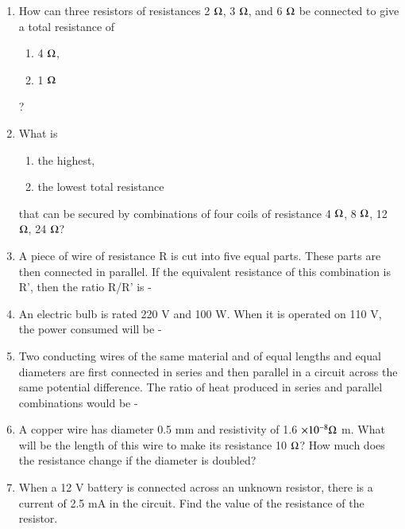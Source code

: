 \begin{enumerate}[label=\arabic*.,ref=\thesubsection.\theenumi]
\item  How can three resistors of resistances 2 $\ohm$, 3 $\ohm$, and 6 $\ohm$ be connected to give a total resistance of
 \begin{enumerate} \item 4 $\ohm$, \item 1 $\ohm$ \end{enumerate}?
\item What is 
\begin{enumerate} \item the highest, \item the lowest total resistance 
\end{enumerate}
that can be secured by combinations of four coils of resistance 4 $\ohm$, 8 $\ohm$, 12 $\ohm$, 24 $\ohm$?
\item  A piece of wire of resistance R is cut into five equal parts. These parts are then connected in parallel. If the equivalent resistance of this combination is R', then the ratio R/R' is -
\item  An electric bulb is rated 220 V and 100 W. When it is operated on 110 V, the power consumed will be - 
\item  Two conducting wires of the same material and of equal lengths and equal diameters are first connected in series and then parallel in a circuit across the same potential difference. The ratio of heat produced in series and parallel combinations would be -
\item  A copper wire has diameter 0.5 mm and resistivity of 1.6 $\times 10^{-8} \ohm$ m. What will be
the length of this wire to make its resistance 10 $\ohm$? How much does the resistance change if the diameter is doubled?
\item  When a 12 V battery is connected across an unknown resistor, there is a current of 2.5 mA in the circuit. Find the value of the resistance of the resistor.

\end{enumerate}
